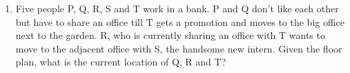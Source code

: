 \documentclass[a4paper, 11pt]{article}
\begin{document}
\begin{enumerate}
    \item Five people P, Q, R, S and T work in a bank. P and Q don't like each other but have to share an office till T gets a promotion and moves to the big office next to the garden. R, who is currently sharing an office with T wants to move to the adjacent office with S, the handsome new intern. Given the floor plan, what is the current location of Q, R and T? 
    \begin{enumerate}
\end{enumerate}
\end{enumerate}
\end{document}
